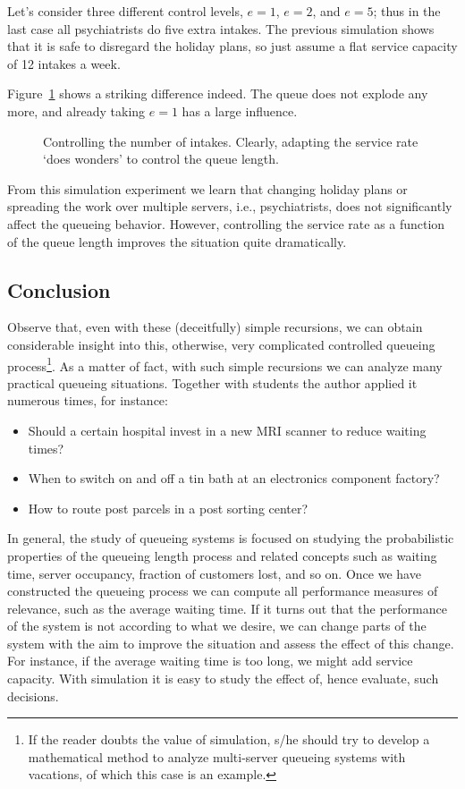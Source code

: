 Let's consider three different control levels, $e=1$, $e=2$, and $e=5$; thus in 
the last case all psychiatrists do five extra intakes. The previous simulation 
shows that it is safe to disregard the holiday plans, so just assume a flat 
service capacity of 12 intakes a week.

Figure~\ref{fig:intakes} shows a striking difference indeed. The queue
does not explode any more, and already taking $e=1$ has a large
influence. 

\begin{figure}[ht]
  \centering
  
\caption{Controlling the number of intakes. Clearly, adapting the
  service rate `does wonders' to control the queue length.}
\label{fig:intakes}
\end{figure}

From this simulation experiment we learn that changing holiday plans or spreading the work over multiple servers, i.e., psychiatrists, does not significantly affect the queueing behavior.
However, controlling the service rate as a function of the queue length improves the situation quite dramatically.


\subsection*{Conclusion}
\label{sec:conclusion}

Observe that, even with these (deceitfully) simple recursions, we can obtain considerable insight into this, otherwise, very complicated controlled queueing process\footnote{If the reader doubts the value of simulation, s/he should try to develop a mathematical method to analyze multi-server queueing systems with vacations, of which this case is an example.}.
As a matter of fact, with such simple recursions we can analyze many practical queueing situations.
Together with students the author applied it numerous times, for instance:
\begin{itemize}
\item Should a certain hospital invest in a new MRI scanner to reduce
  waiting times?
\item When to switch on and off a tin bath at an electronics component factory?
\item How to route post parcels in a post sorting center?
\end{itemize}

In general, the study of queueing systems is focused on studying the probabilistic properties of the queueing length process and related concepts such as waiting time, server occupancy, fraction of customers lost, and so on.
Once we have constructed the queueing process we can compute all performance measures of relevance, such as the average waiting time.
If it turns out that the performance of the system is not according to what we desire, we can change parts of the system with the aim to improve the situation and assess the effect of this change.
For instance, if the average waiting time is too long, we might add service capacity.
With simulation it is easy to study the effect of, hence evaluate, such decisions.

